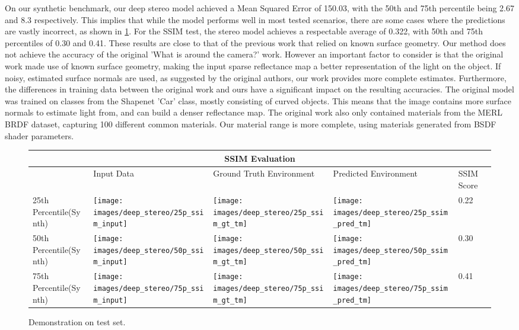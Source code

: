 \documentclass[ %
                    author={Gavin Parker},
                supervisor={Dr. Neill Campbell},
                    degree={MEng},
                     title={Deep Siamese Networks for Illumination Estimation from Stereo Images},
                  subtitle={},
                      type={research},
                      year={2018} ]{dissertation}
\begin{document}
\newline
On our synthetic benchmark, our deep stereo model achieved a Mean Squared Error of 150.03, with the 50th and 75th percentile being 2.67 and 8.3 respectively. This implies that while the model performs well in most tested scenarios, there are some cases where the predictions are vastly incorrect, as shown in \ref{ssim_results}. For the SSIM test, the stereo model achieves a respectable average of 0.322, with 50th and 75th percentiles of 0.30 and 0.41. These results are close to that of the previous work that relied on known surface geometry.
\newline
Our method does not achieve the accuracy of the original 'What is around the camera?' work. However an important factor to consider is that the original work made use of known surface geometry, making the input sparse reflectance map a better representation of the light on the object. If noisy, estimated surface normals are used, as suggested by the original authors, our work provides more complete estimates. Furthermore, the differences in training data between the original work and ours have a significant impact on the resulting accuracies. The original model was trained on classes from the Shapenet 'Car' class, mostly consisting of curved objects. This means that the image contains more surface normals to estimate light from, and can build a denser reflectance map. The original work also only contained materials from the MERL BRDF dataset, capturing 100 different common materials. Our material range is more complete, using materials generated from BSDF shader parameters.
\begin{figure}[H]
\centering
\begin{tabular}{ |p{3cm}||p{3cm}|p{3cm}|p{3cm}|p{3cm}|  }
 \hline
 \multicolumn{5}{|c|}{SSIM Evaluation} \\
 \hline
  & Input Data &Ground Truth Environment&Predicted Environment&SSIM Score\\
 \hline
 25th Percentile(Synth)&\parbox[c]{1em}{
 \texttt{[image: images/deep\_stereo/25p\_ssim\_input]}}&\parbox[c]{1em}{\texttt{[image: images/deep\_stereo/25p\_ssim\_gt\_tm]}}&
\parbox[c]{1em}{\texttt{[image: images/deep\_stereo/25p\_ssim\_pred\_tm]}}& 0.22\\
 50th Percentile(Synth)&\parbox[c]{1em}{
 \texttt{[image: images/deep\_stereo/50p\_ssim\_input]}}&\parbox[c]{1em}{\texttt{[image: images/deep\_stereo/50p\_ssim\_gt\_tm]}}&
\parbox[c]{1em}{\texttt{[image: images/deep\_stereo/50p\_ssim\_pred\_tm]}}& 0.30\\
 75th Percentile(Synth)&\parbox[c]{1em}{
 \texttt{[image: images/deep\_stereo/75p\_ssim\_input]}}&\parbox[c]{1em}{\texttt{[image: images/deep\_stereo/75p\_ssim\_gt\_tm]}}&
\parbox[c]{1em}{\texttt{[image: images/deep\_stereo/75p\_ssim\_pred\_tm]}}& 0.41\\

 \hline
\end{tabular}

\label{ssim_results}
\caption{Demonstration on test set.}

\end{figure}
\end{document}
